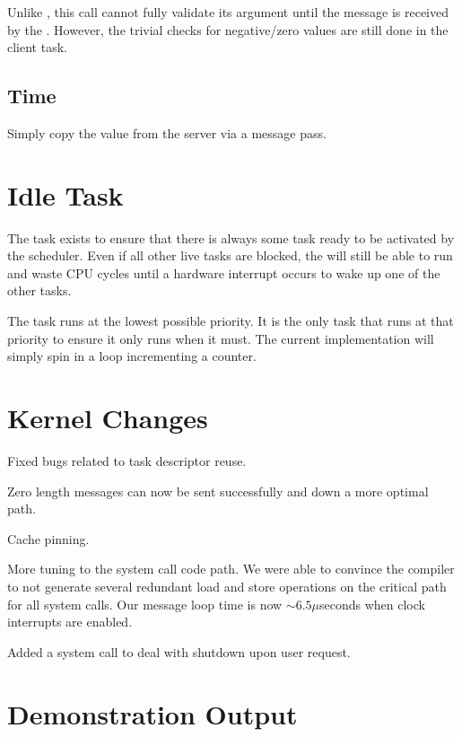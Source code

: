 \documentclass[pdftex,10pt,a4paper]{article}
\begin{document}
Unlike , this call cannot fully validate its argument until
the message is received by the . However, the
trivial checks for negative/zero values are still done in the client
task.

\subsection*{Time}

Simply copy the value from the server via a message pass.

\section*{Idle Task}

The  task exists to ensure that there is always some task
ready to be activated by the scheduler. Even if all other live tasks
are blocked, the  will still be able to run and waste CPU
cycles until a hardware interrupt occurs to wake up one of the other
tasks.

The  task runs at the lowest possible priority. It is the
only task that runs at that priority to ensure it only runs when it
must. The current implementation will simply spin in a 
loop incrementing a counter.


\section*{Kernel Changes}

Fixed bugs related to task descriptor reuse.

Zero length messages can now be sent successfully and down a more
optimal path.

Cache pinning.

More tuning to the system call code path. We were able to convince the
compiler to not generate several redundant load and store operations on
the critical path for all system calls. Our message loop time is now
$\sim6.5\mu$seconds when clock interrupts are enabled.

Added a  system call to deal with shutdown upon user
request.


\section*{Demonstration Output}
\end{document}
